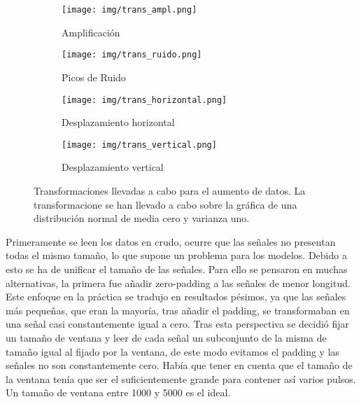     \begin{figure}[H]
             \centering
             \begin{subfigure}[b]{0.4\textwidth}
             \texttt{[image: img/trans\_ampl.png]}
             \caption{Amplificación}
             \label{fig:data_aug_ampl}
             \end{subfigure}
             \hfill
             \begin{subfigure}[b]{0.4\textwidth}
             \texttt{[image: img/trans\_ruido.png]}
             \caption{Picos de Ruido}
             \label{fig:data_aug_ruido}
             \end{subfigure}
             
             \hfill
             
             \begin{subfigure}[b]{0.4\textwidth}
             \texttt{[image: img/trans\_horizontal.png]}
             \caption{Desplazamiento horizontal}
             \label{fig:data_aug_horizontal}
             \end{subfigure}
             \hfill
             \begin{subfigure}[b]{0.4\textwidth}
             \texttt{[image: img/trans\_vertical.png]}
             \caption{Desplazamiento vertical}
             \label{fig:data_aug_vertical}
             \end{subfigure}
             
             \caption{Transformaciones llevadas a cabo para el aumento de datos. La transformacione se han llevado a cabo sobre la gráfica de una distribución normal de media cero y varianza uno.}
             \label{fig:data_aug}
         \end{figure}
         
    Primeramente se leen los datos en crudo, ocurre que las señales no presentan todas el mismo tamaño, lo que supone un problema para los modelos. Debido a esto se ha de unificar el tamaño de las señales. Para ello se pensaron en muchas alternativas, la primera fue añadir zero-padding a las señales de menor longitud. Este enfoque en la práctica se tradujo en resultados pésimos, ya que las señales más pequeñas, que eran la mayoría, tras añadir el padding, se transformaban en una señal casi constantemente igual a cero. Tras esta perspectiva se decidió fijar un tamaño de ventana y leer de cada señal un subconjunto de la misma de tamaño igual al fijado por la ventana, de este modo evitamos el padding y las señales no son constantemente cero. Había que tener en cuenta que el tamaño de la ventana tenía que ser el suficientemente grande para contener así varios pulsos. Un tamaño de ventana entre 1000 y 5000 es el ideal. \\
    
